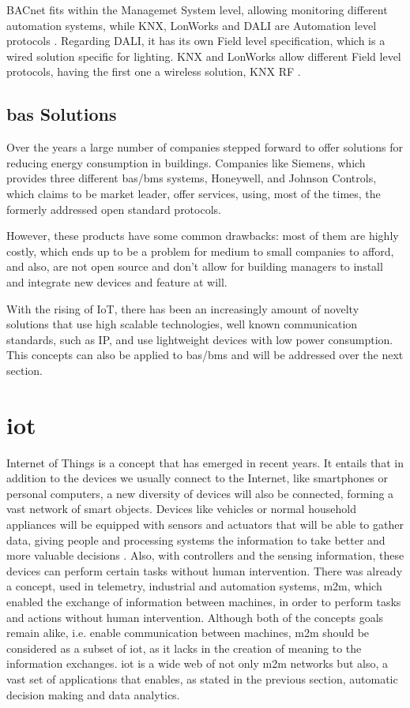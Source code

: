 BACnet fits within the Managemet System level, allowing monitoring different automation systems, while KNX, LonWorks and DALI are Automation level protocols \cite{Siemens2013}. Regarding DALI, it has its own Field level specification, which is a wired solution specific for lighting. KNX and LonWorks allow different Field level protocols, having the first one a wireless solution, KNX RF \cite{Reinisch2007}.

\subsection{\ac{bas} Solutions}

Over the years a large number of companies stepped forward to offer solutions for reducing energy consumption in buildings. Companies like Siemens, which provides three different \ac{bas}/\ac{bms} systems, Honeywell, and Johnson Controls, which claims to be market leader, offer services, using, most of the times, the formerly addressed open standard protocols.


However, these products have some common drawbacks: most of them are highly costly, which ends up to be a problem for medium to small companies to afford, and also, are not open source and don't allow for building managers to install and integrate new devices and feature at will. 

With the rising of IoT, there has been an increasingly amount of novelty solutions that use high scalable technologies, well known communication standards, such as IP, and use lightweight devices with low power consumption. This concepts can also be applied to \ac{bas}/\ac{bms} and will be addressed over the next section.

\section{\acf{iot}}

Internet of Things is a concept that has emerged in recent years. It entails that in addition to the devices we usually connect to the Internet, like smartphones or personal computers, a new diversity of devices will also be connected, forming a vast network of smart objects. Devices like vehicles or normal household appliances will be equipped with sensors and actuators that will be able to gather data, giving people and processing systems the information to take better and more valuable decisions \cite{Weiser1991}. Also, with controllers and the sensing information, these devices can perform certain tasks without human intervention. There was already a concept, used in telemetry, industrial and automation systems, \acf{m2m}, which enabled the exchange of information between machines, in order to perform tasks and actions without human intervention. Although both of the concepts goals remain alike, i.e. enable communication between machines, \ac{m2m} should be considered as a subset of \ac{iot}, as it lacks in the creation of meaning to the information exchanges. \ac{iot} is a wide web of not only \ac{m2m} networks but also, a vast set of applications that enables, as stated in the previous section, automatic decision making and data analytics. 

